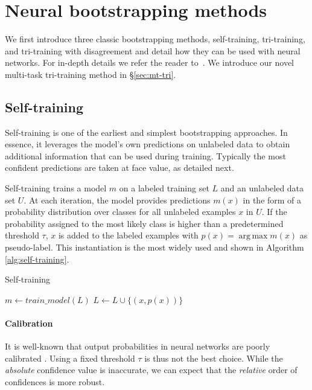 \documentclass[11pt,a4paper]{article}
\DeclareMathOperator*{\argmax}{arg\,max}
\begin{document}
\section{Neural bootstrapping methods} \label{sec:neural_boostrapping}

We first introduce three classic bootstrapping methods, self-training, tri-training, and tri-training with disagreement and detail how they can be used with neural networks. For in-depth details we refer the reader to~\cite{Abney2007,Chapelle2006,Zhu:Goldberg:2009}. We introduce our novel multi-task tri-training method in \S\ref{sec:mt-tri}.

\subsection{Self-training}

Self-training \cite{Yarowsky1995,McClosky2006} is one of the earliest and simplest bootstrapping approaches. In essence, it leverages the model's own predictions on unlabeled data to obtain additional information that can be used during training. Typically the most confident predictions are taken at face value, as detailed next.

Self-training trains a model $m$ on a labeled training set $L$ and an unlabeled data set $U$. At each iteration, the model provides predictions $m(x)$ in the form of a probability distribution over classes for all unlabeled examples $x$ in $U$. If the probability assigned to the most likely class is higher than a predetermined threshold $\tau$, $x$ is added to the labeled examples with $p(x) = \argmax m(x)$ as pseudo-label. This instantiation is the most widely used and shown in Algorithm \ref{alg:self-training}. 

\begin{algorithm}\centering
\caption{Self-training \cite{Abney2007}} \label{alg:self-training}
\begin{algorithmic}[1]
\Repeat
	\State $m \gets train\_model(L)$
        	\State $L \gets L \cup \{(x, p(x))\}$
    	\EndIf
    \EndFor
{}
\end{algorithmic}
\end{algorithm}


\paragraph{Calibration} It is well-known that output probabilities in neural networks are poorly calibrated \cite{Guo2017}. Using a fixed threshold $\tau$ is thus not the best choice. While the \emph{absolute} confidence value is inaccurate, we can expect that the \emph{relative} order of confidences is more robust.
\end{document}
